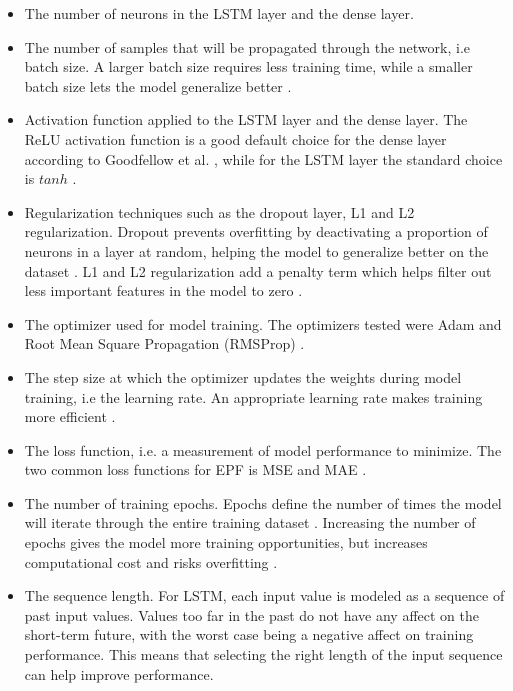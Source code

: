 \begin{itemize}
    \item The number of neurons in the LSTM layer and the dense layer. 
    \item The number of samples that will be propagated through the network, i.e batch size. A larger batch size requires less training time, while a smaller batch size lets the model generalize better \cite{batchSize}. 
    \item Activation function applied to the LSTM layer and the dense layer. The ReLU activation function is a good default choice for the dense layer according to Goodfellow et al. \cite{goodfellow}, while for the LSTM layer the standard choice is $tanh$ \cite{diveLSTM}.
    \item Regularization techniques such as the dropout layer, L1 and L2 regularization. Dropout prevents overfitting by deactivating a proportion of neurons in a layer at random, helping the model to generalize better on the dataset \cite{goodfellow}. L1 and L2 regularization add a penalty term which helps filter out less important features in the model to zero \cite{diveLSTM}. 
    \item The optimizer used for model training. The optimizers tested were Adam \cite{adam, goodfellow} and Root Mean Square Propagation (RMSProp) \cite{goodfellow}. 
    \item The step size at which the optimizer updates the weights during model training, i.e the learning rate. An appropriate learning rate makes training more efficient \cite{goodfellow}. 
    \item The loss function, i.e. a measurement of model performance to minimize. The two common loss functions for EPF is MSE and MAE \cite{diveLSTM}. 
    \item The number of training epochs. Epochs define the number of times the model will iterate through the entire training dataset \cite{nielsen}. Increasing the number of epochs gives the model more training opportunities, but increases computational cost and risks overfitting \cite{goodfellow}. 
    \item The sequence length. For LSTM, each input value is modeled as a sequence of past input values. Values too far in the past do not have any affect on the short-term future, with the worst case being a negative affect on training performance. This means that selecting the right length of the input sequence can help improve performance. 
\end{itemize}

